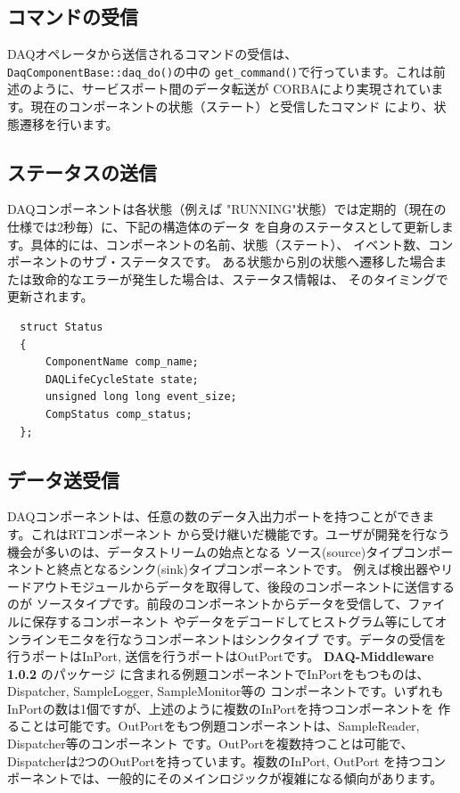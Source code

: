 \documentclass[a4j,10pt,dvips,onecolumn,oneside,final]{jarticle}%
\newcommand {\daqmwcurrent} {
	{\bf DAQ-Middleware 1.0.2}
}
\begin{document}
\subsection{コマンドの受信}
DAQオペレータから送信されるコマンドの受信は、\verb|DaqComponentBase::daq_do()|の中の 
\verb|get_command()|で行っています。これは前述のように、サービスポート間のデータ転送が
CORBAにより実現されています。現在のコンポーネントの状態（ステート）と受信したコマンド
により、状態遷移を行います。

\subsection{ステータスの送信}
DAQコンポーネントは各状態（例えば "RUNNING"状態）では定期的（現在の仕様では2秒毎）に、下記の構造体のデータ
を自身のステータスとして更新します。具体的には、コンポーネントの名前、状態（ステート）、
イベント数、コンポーネントのサブ・ステータスです。
ある状態から別の状態へ遷移した場合または致命的なエラーが発生した場合は、ステータス情報は、
そのタイミングで更新されます。

\begin{Verbatim}
  struct Status
  {
      ComponentName comp_name;
      DAQLifeCycleState state;
      unsigned long long event_size;
      CompStatus comp_status;
  };
\end{Verbatim}

\subsection{データ送受信}
DAQコンポーネントは、任意の数のデータ入出力ポートを持つことができます。これはRTコンポーネント
から受け継いだ機能です。ユーザが開発を行なう機会が多いのは、データストリームの始点となる
ソース(source)タイプコンポーネントと終点となるシンク(sink)タイプコンポーネントです。
例えば検出器やリードアウトモジュールからデータを取得して、後段のコンポーネントに送信するのが
ソースタイプです。前段のコンポーネントからデータを受信して、ファイルに保存するコンポーネント
やデータをデコードしてヒストグラム等にしてオンラインモニタを行なうコンポーネントはシンクタイプ
です。データの受信を行うポートはInPort, 送信を行うポートはOutPortです。\daqmwcurrent のパッケージ
に含まれる例題コンポーネントでInPortをもつものは、Dispatcher, SampleLogger, SampleMonitor等の
コンポーネントです。いずれもInPortの数は1個ですが、上述のように複数のInPortを持つコンポーネントを
作ることは可能です。OutPortをもつ例題コンポーネントは、SampleReader, Dispatcher等のコンポーネント
です。OutPortを複数持つことは可能で、Dispatcherは2つのOutPortを持っています。複数のInPort, OutPort
を持つコンポーネントでは、一般的にそのメインロジックが複雑になる傾向があります。
\end{document}
